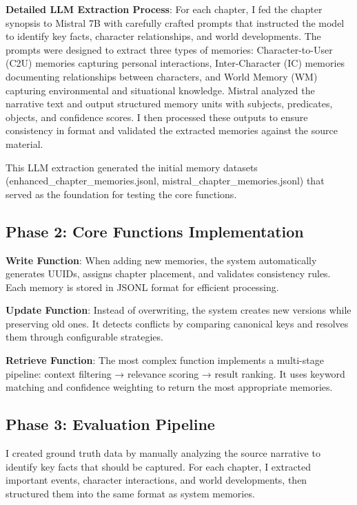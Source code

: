 \documentclass[11pt,a4paper]{article}
\begin{document}
\textbf{Detailed LLM Extraction Process}: For each chapter, I fed the chapter synopsis to Mistral 7B with carefully crafted prompts that instructed the model to identify key facts, character relationships, and world developments. The prompts were designed to extract three types of memories: Character-to-User (C2U) memories capturing personal interactions, Inter-Character (IC) memories documenting relationships between characters, and World Memory (WM) capturing environmental and situational knowledge. Mistral analyzed the narrative text and output structured memory units with subjects, predicates, objects, and confidence scores. I then processed these outputs to ensure consistency in format and validated the extracted memories against the source material.

This LLM extraction generated the initial memory datasets (enhanced\_chapter\_memories.jsonl, mistral\_chapter\_memories.jsonl) that served as the foundation for testing the core functions.

\subsection{Phase 2: Core Functions Implementation}

\textbf{Write Function}: When adding new memories, the system automatically generates UUIDs, assigns chapter placement, and validates consistency rules. Each memory is stored in JSONL format for efficient processing.

\textbf{Update Function}: Instead of overwriting, the system creates new versions while preserving old ones. It detects conflicts by comparing canonical keys and resolves them through configurable strategies.

\textbf{Retrieve Function}: The most complex function implements a multi-stage pipeline: context filtering → relevance scoring → result ranking. It uses keyword matching and confidence weighting to return the most appropriate memories.

\subsection{Phase 3: Evaluation Pipeline}

I created ground truth data by manually analyzing the source narrative to identify key facts that should be captured. For each chapter, I extracted important events, character interactions, and world developments, then structured them into the same format as system memories.
\end{document}
